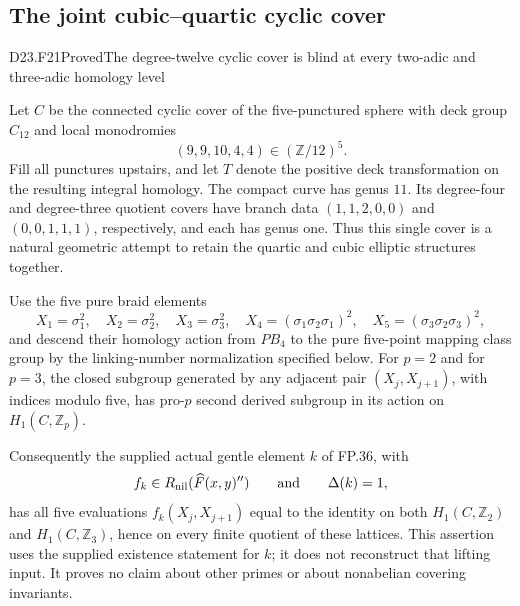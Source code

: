 \subsection{The joint cubic--quartic cyclic cover}

\begin{statement}{D23.F21}{Proved}{The degree-twelve cyclic cover is blind at every two-adic and three-adic homology level}
\end{statement}
Let $C$ be the connected cyclic cover of the five-punctured sphere with
deck group $C_{12}$ and local monodromies
\[
 (9,9,10,4,4)\in(\mathbb Z/12)^5.
\]
Fill all punctures upstairs, and let $T$ denote the positive deck
transformation on the resulting integral homology. The compact curve has
genus $11$. Its degree-four and degree-three quotient covers have branch
data $(1,1,2,0,0)$ and $(0,0,1,1,1)$, respectively, and each has genus one.
Thus this single cover is a natural geometric attempt to retain the
quartic and cubic elliptic structures together.

Use the five pure braid elements
\[
 X_1=\sigma_1^2,\quad X_2=\sigma_2^2,\quad
 X_3=\sigma_3^2,\quad X_4=(\sigma_1\sigma_2\sigma_1)^2,
 \quad X_5=(\sigma_3\sigma_2\sigma_3)^2,
\]
and descend their homology action from $PB_4$ to the pure five-point
mapping class group by the linking-number normalization specified below.
For $p=2$ and for $p=3$, the closed subgroup generated by any adjacent
pair $(X_j,X_{j+1})$, with indices modulo five, has pro-$p$ second
derived subgroup in its action on $H_1(C,\mathbb Z_p)$.

Consequently the supplied actual gentle element $k$ of
\textup{FP.36}, with
\[
 f_k\in R_{\rm nil}(\widehat F(x,y)'')\qquad\hbox{and}\qquad
 \Delta(k)=1,
\]
has all five evaluations $f_k(X_j,X_{j+1})$ equal to the identity on
both $H_1(C,\mathbb Z_2)$ and $H_1(C,\mathbb Z_3)$, hence on every
finite quotient of these lattices. This assertion uses the supplied
existence statement for $k$; it does not reconstruct that lifting input.
It proves no claim about other primes or about nonabelian covering
invariants.


